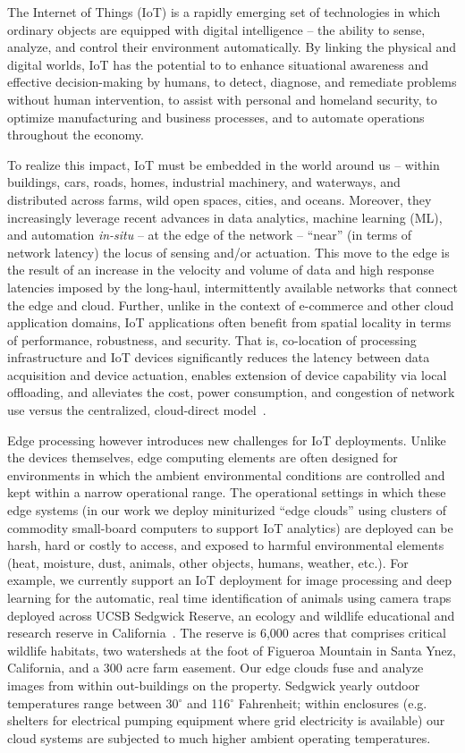 The Internet of Things (IoT) is a rapidly emerging set of technologies in
which ordinary objects are equipped with digital intelligence -- the ability
to sense, analyze, and control their environment automatically. By linking the
physical and digital worlds, IoT has the potential to to enhance situational
awareness and effective decision-making by humans, to detect, diagnose, and
remediate problems without human intervention, to assist with personal and
homeland security, to optimize manufacturing and business processes, and to
automate operations throughout the economy.

To realize this impact, IoT must be embedded in the world around us --
within buildings, cars, roads, homes, industrial machinery, and waterways, and
distributed across farms, wild open spaces, cities, and oceans. Moreover, they
increasingly leverage recent advances in data analytics, machine learning
(ML), and automation \textit{in-situ} -- at the edge of the network --
``near'' (in terms of network latency) the locus of sensing and/or actuation.
This move to the edge is the result of an increase in
the velocity and volume of data and high response latencies imposed by the
long-haul, intermittently available networks that connect the edge and cloud.
Further, unlike in the context of e-commerce and other cloud application
domains, IoT applications often benefit from spatial locality in terms of
performance, robustness, and security.
That is, co-location of processing infrastructure and IoT devices significantly reduces
the latency between data acquisition and device actuation, enables extension
of device capability via local offloading, and alleviates the cost, power
consumption, and congestion of network use versus the centralized,
cloud-direct
model~\cite{edge,bonomi2012fog,cloudlets,cloudlets2012satya,verbelen2012cloudlets}.

Edge processing however introduces new challenges for IoT deployments. Unlike
the devices themselves, edge computing elements are often designed for
environments in which the ambient environmental conditions are controlled and
kept within a narrow operational range.  
The
operational settings in which these edge systems (in our work we deploy
miniturized ``edge clouds'' using clusters of commodity small-board computers to 
support IoT analytics) are deployed
can be harsh, hard or costly to access, and exposed to harmful environmental
elements (heat, moisture, dust, animals, other objects, humans, weather,
etc.). For example, we currently support an IoT deployment for image
processing and deep learning for the automatic, real time identification of
animals using camera traps deployed across UCSB Sedgwick Reserve, an ecology
and wildlife educational and research reserve in
California~\cite{ref:sedgwick}. The reserve is 6,000 acres that comprises
critical wildlife habitats, two watersheds at the foot of Figueroa Mountain in
Santa Ynez, California,
and a 300 acre farm easement. Our edge clouds fuse and analyze images from
within out-buildings on the property. Sedgwick yearly outdoor temperatures range
between 30$^{\circ}$ and 116$^{\circ}$ Fahrenheit; within enclosures (e.g.
shelters for electrical pumping equipment where grid electricity is available)
our cloud systems are subjected to much higher ambient operating temperatures.

